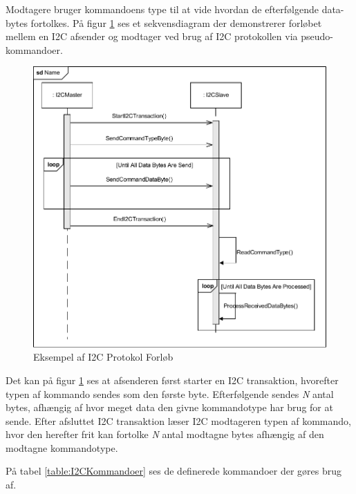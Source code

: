 Modtagere bruger kommandoens type til at vide hvordan de efterfølgende data-bytes fortolkes. På figur \ref{fig:I2CProtokolEksempel} ses et sekvensdiagram der demonstrerer forløbet mellem en I2C afsender og modtager ved brug af I2C protokollen via pseudo-kommandoer.

\begin{figure}[H]
	\centering
	\includegraphics[width=\textwidth] {Systemarkitektur/images/I2CProtocol}
	\caption{Eksempel af I2C Protokol Forløb}
	\label{fig:I2CProtokolEksempel}
\end{figure}

Det kan på figur \ref{fig:I2CProtokolEksempel} ses at afsenderen først starter en I2C transaktion, hvorefter typen af kommando sendes som den første byte. Efterfølgende sendes \textit{N} antal bytes, afhængig af hvor meget data den givne kommandotype har brug for at sende. Efter afsluttet I2C transaktion læser I2C modtageren typen af kommando, hvor den herefter frit kan fortolke \textit{N} antal modtagne bytes afhængig af den modtagne kommandotype.

På tabel \ref{table:I2CKommandoer} ses de definerede kommandoer der gøres brug af.

